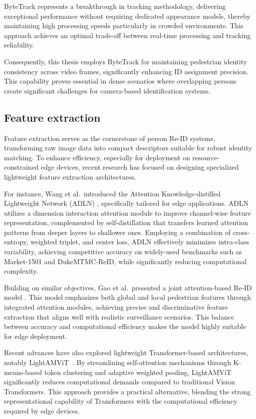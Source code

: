 \documentclass[../main.tex]{subfiles}
\begin{document}
ByteTrack \cite{bytetrack} represents a breakthrough in tracking methodology, delivering exceptional performance without requiring dedicated appearance models, thereby maintaining high processing speeds particularly in crowded environments. This approach achieves an optimal trade-off between real-time processing and tracking reliability. 

Consequently, this thesis employs ByteTrack for maintaining pedestrian identity consistency across video frames, significantly enhancing ID assignment precision. This capability proves essential in dense scenarios where overlapping persons create significant challenges for camera-based identification systems.

\subsection{Feature extraction}
\label{sec:feature_extraction}

Feature extraction serves as the cornerstone of person Re-ID systems, transforming raw image data into compact descriptors suitable for robust identity matching. To enhance efficiency, especially for deployment on resource-constrained edge devices, recent research has focused on designing specialized lightweight feature extraction architectures.

For instance, Wang et al.~introduced the Attention Knowledge-distilled Lightweight Network (ADLN) \cite{adln}, specifically tailored for edge applications. ADLN utilizes a dimension interaction attention module to improve channel-wise feature representation, complemented by self-distillation that transfers learned attention patterns from deeper layers to shallower ones. Employing a combination of cross-entropy, weighted triplet, and center loss, ADLN effectively minimizes intra-class variability, achieving competitive accuracy on widely-used benchmarks such as Market-1501 and DukeMTMC-ReID, while significantly reducing computational complexity.

Building on similar objectives, Gao et al.~presented a joint attention-based Re-ID model \cite{jointattention}. This model emphasizes both global and local pedestrian features through integrated attention modules, achieving precise and discriminative feature extraction that aligns well with realistic surveillance scenarios. This balance between accuracy and computational efficiency makes the model highly suitable for edge deployment.

Recent advances have also explored lightweight Transformer-based architectures, notably LightAMViT~\cite{lightamvit}. By streamlining self-attention mechanisms through K-means-based token clustering and adaptive weighted pooling, LightAMViT significantly reduces computational demands compared to traditional Vision Transformers. This approach provides a practical alternative, blending the strong representational capability of Transformers with the computational efficiency required by edge devices.
\end{document}
